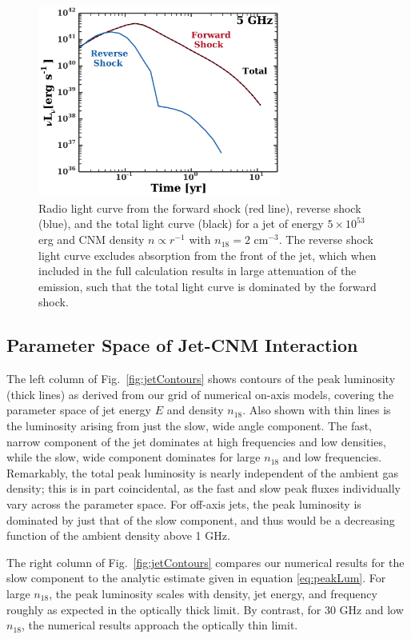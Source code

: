 \documentclass[usenatbib,fleqn]{mnras}
\begin{document}
\begin{figure}
  \includegraphics[width=8cm]{reverse.pdf}
  \caption{\label{fig:reverse} Radio light curve from the forward
    shock (red line), reverse shock (blue), and the total light curve
    (black) for a jet of energy $5\times 10^{53}$ erg and CNM density
    $n\propto r^{-1}$ with $n_{18} = 2$ cm$^{-3}$. The reverse shock
    light curve excludes absorption from the front of the jet, which
    when included in the full calculation results in large attenuation
    of the emission, such that the total light curve is dominated by
    the forward shock.}
\end{figure}

\subsection{Parameter Space of Jet-CNM Interaction}
\label{sec:param}
The left column of Fig.~\ref{fig:jetContours} shows contours of the
peak luminosity (thick lines) as derived from our grid of numerical
on-axis models, covering the parameter space of jet energy $E$ and
density $n_{18}$.  Also shown with thin lines is the luminosity
arising from just the slow, wide angle component.  The fast, narrow
component of the jet dominates at high frequencies and low densities,
while the slow, wide component dominates for large $n_{18}$ and low
frequencies.  Remarkably, the total peak luminosity is nearly
independent of the ambient gas density; this is in part coincidental,
as the fast and slow peak fluxes individually vary across the
parameter space. For off-axis jets, the peak luminosity is dominated
by just that of the slow component, and thus would be a decreasing
function of the ambient density above 1 GHz.

The right column of Fig.~\ref{fig:jetContours} compares our numerical
results for the slow component to the analytic estimate given in
equation \eqref{eq:peakLum}.  For large $n_{18}$, the peak luminosity
scales with density, jet energy, and frequency roughly as expected in
the optically thick limit.  By contrast, for 30 GHz and low $n_{18}$,
the numerical results approach the optically thin limit.
\end{document}
